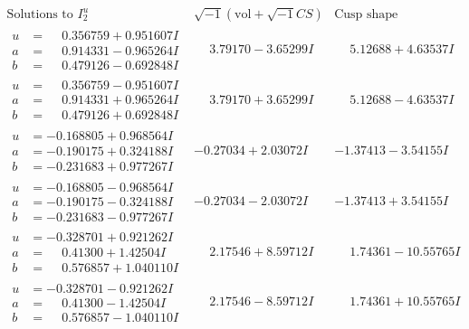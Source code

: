 \documentclass[1p]{elsarticle_modified}
\theoremstyle{definition}
\newcommand{\I}{\sqrt{-1}}
\begin{document}
$$\begin{array}{c|c|c}  
\text{Solutions to }I^u_{2}& \I (\text{vol} + \sqrt{-1}CS) & \text{Cusp shape}\\
 \hline 
\begin{aligned}
u &= \phantom{-}0.356759 + 0.951607 I \\
a &= \phantom{-}0.914331 - 0.965264 I \\
b &= \phantom{-}0.479126 - 0.692848 I\end{aligned}
 & \phantom{-}3.79170 - 3.65299 I & \phantom{-}5.12688 + 4.63537 I \\ \hline\begin{aligned}
u &= \phantom{-}0.356759 - 0.951607 I \\
a &= \phantom{-}0.914331 + 0.965264 I \\
b &= \phantom{-}0.479126 + 0.692848 I\end{aligned}
 & \phantom{-}3.79170 + 3.65299 I & \phantom{-}5.12688 - 4.63537 I \\ \hline\begin{aligned}
u &= -0.168805 + 0.968564 I \\
a &= -0.190175 + 0.324188 I \\
b &= -0.231683 + 0.977267 I\end{aligned}
 & -0.27034 + 2.03072 I & -1.37413 - 3.54155 I \\ \hline\begin{aligned}
u &= -0.168805 - 0.968564 I \\
a &= -0.190175 - 0.324188 I \\
b &= -0.231683 - 0.977267 I\end{aligned}
 & -0.27034 - 2.03072 I & -1.37413 + 3.54155 I \\ \hline\begin{aligned}
u &= -0.328701 + 0.921262 I \\
a &= \phantom{-}0.41300 + 1.42504 I \\
b &= \phantom{-}0.576857 + 1.040110 I\end{aligned}
 & \phantom{-}2.17546 + 8.59712 I & \phantom{-}1.74361 - 10.55765 I \\ \hline\begin{aligned}
u &= -0.328701 - 0.921262 I \\
a &= \phantom{-}0.41300 - 1.42504 I \\
b &= \phantom{-}0.576857 - 1.040110 I\end{aligned}
 & \phantom{-}2.17546 - 8.59712 I & \phantom{-}1.74361 + 10.55765 I \\ \hline\begin{aligned}

\end{aligned}
\end{array}$$
\end{document}
